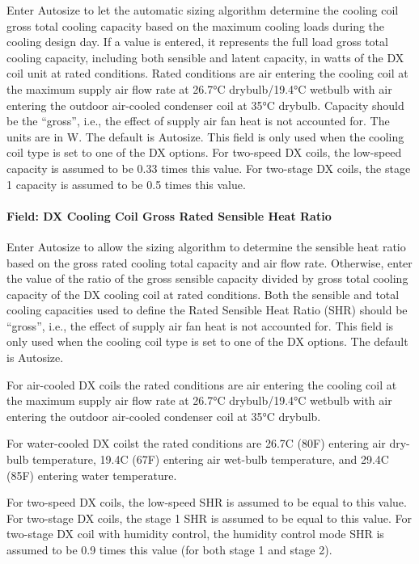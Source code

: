 Enter Autosize to let the automatic sizing algorithm determine the cooling coil gross total cooling capacity based on the maximum cooling loads during the cooling design day. If a value is entered, it represents the full load gross total cooling capacity, including both sensible and latent capacity, in watts of the DX coil unit at rated conditions. Rated conditions are air entering the cooling coil at the maximum supply air flow rate at 26.7°C drybulb/19.4°C wetbulb with air entering the outdoor air-cooled condenser coil at 35°C drybulb. Capacity should be the ``gross'', i.e., the effect of supply air fan heat is not accounted for. The units are in W. The default is Autosize. This field is only used when the cooling coil type is set to one of the DX options. For two-speed DX coils, the low-speed capacity is assumed to be 0.33 times this value. For two-stage DX coils, the stage 1 capacity is assumed to be 0.5 times this value.

\paragraph{Field: DX Cooling Coil Gross Rated Sensible Heat Ratio}\label{field-dx-cooling-coil-gross-rated-sensible-heat-ratio}

Enter Autosize to allow the sizing algorithm to determine the sensible heat ratio based on the gross rated cooling total capacity and air flow rate. Otherwise, enter the value of the ratio of the gross sensible capacity divided by gross total cooling capacity of the DX cooling coil at rated conditions. Both the sensible and total cooling capacities used to define the Rated Sensible Heat Ratio (SHR) should be ``gross'', i.e., the effect of supply air fan heat is not accounted for. This field is only used when the cooling coil type is set to one of the DX options. The default is Autosize.

For air-cooled DX coils the rated conditions are air entering the cooling coil at the maximum supply air flow rate at 26.7°C drybulb/19.4°C wetbulb with air entering the outdoor air-cooled condenser coil at 35°C drybulb.

For water-cooled DX coilst the rated conditions are 26.7C (80F) entering air dry-bulb temperature, 19.4C (67F) entering air wet-bulb temperature, and 29.4C (85F) entering water temperature.

For two-speed DX coils, the low-speed SHR is assumed to be equal to this value. For two-stage DX coils, the stage 1 SHR is assumed to be equal to this value. For two-stage DX coil with humidity control, the humidity control mode SHR is assumed to be 0.9 times this value (for both stage 1 and stage 2).

